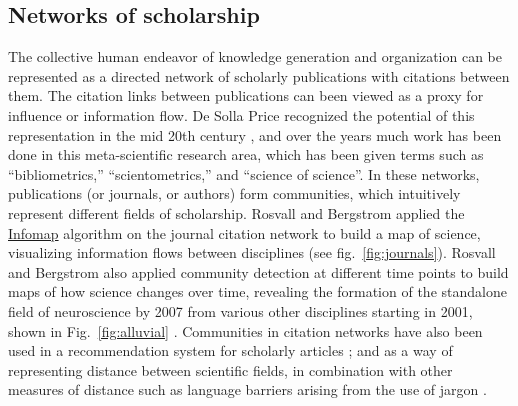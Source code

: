 \hypertarget{networks-of-scholarship}{\subsection{Networks of
scholarship}\label{networks-of-scholarship}}

The collective human endeavor of knowledge generation and organization
can be represented as a directed network of scholarly publications with
citations between them. The citation links between publications can been
viewed as a proxy for influence or information flow. De Solla Price
recognized the potential of this representation in the mid 20th century
\autocite{de_solla_price_networks_1965}, and over the years much work
has been done in this meta-scientific research area, which has been
given terms such as ``bibliometrics,'' ``scientometrics,'' and ``science
of science''. In these networks, publications (or journals, or authors)
form communities, which intuitively represent different fields of
scholarship. Rosvall and Bergstrom \autocite{rosvall_maps_2008} applied
the \protect\hyperlink{the-dynamical-perspective}{Infomap} algorithm on
the journal citation network to build a map of science, visualizing
information flows between disciplines (see fig.~\ref{fig:journals}).
Rosvall and Bergstrom also applied community detection at different time
points to build maps of how science changes over time, revealing the
formation of the standalone field of neuroscience by 2007 from various
other disciplines starting in 2001, shown in Fig.~\ref{fig:alluvial}
\autocite{rosvall_mapping_2010}. Communities in citation networks have
also been used in a recommendation system for scholarly articles
\autocite{west_recommendation_2016}; and as a way of representing
distance between scientific fields, in combination with other measures
of distance such as language barriers arising from the use of jargon
\autocite{vilhena_finding_2014}.

